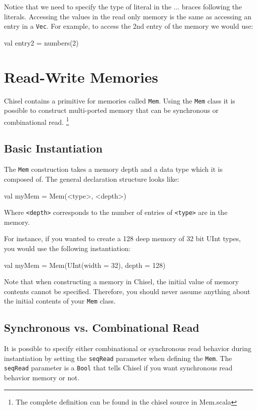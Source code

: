 \documentclass[twocolumn, 10pt]{article}
\begin{document}
Notice that we need to specify the type of literal in the {...} braces following the literals. Accessing the values in the read only memory is the same as accessing an entry in a \verb+Vec+. For example, to access the 2nd entry of the memory we would use:

\begin{scala}
val entry2 = numbers(2)
\end{scala}

\section{Read-Write Memories}

Chisel contains a primitive for memories called \verb+Mem+. Using the \verb+Mem+ class it is possible to construct multi-ported memory that can be synchronous or combinational read. \footnote{The complete definition can be found in the chisel source in  Mem.scala}

\subsection{Basic Instantiation}

The \verb+Mem+ construction takes a memory depth and a data type which it is composed of. The general declaration structure looks like:

\begin{scala}
val myMem = Mem(<type>, <depth>)
\end{scala}

Where \verb+<depth>+ corresponds to the number of entries of \verb+<type>+ are in the memory.

For instance, if you wanted to create a 128 deep memory of 32 bit UInt types, you would use the following instantiation:

\begin{scala}
val myMem = Mem(UInt(width = 32), depth = 128)
\end{scala}

Note that when constructing a memory in Chisel, the initial value of memory contents cannot be specified. Therefore, you should never assume anything about the initial contents of your \verb+Mem+ class.

\subsection{Synchronous vs. Combinational Read}

It is possible to specify either combinational or synchronous read behavior during instantiation by setting the \verb+seqRead+ parameter when defining the \verb+Mem+. The \verb+seqRead+ parameter is a \verb+Bool+ that tells Chisel if you want synchronous read behavior memory or not.
\end{document}
